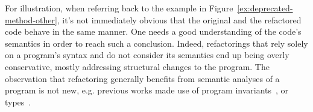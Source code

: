 \documentclass[sigconf,review,anonymous]{acmart}
\begin{document}
For
illustration, when referring back to the example in
Figure~\ref{ex:deprecated-method-other}, it's not immediately
obvious that the original and the refactored code behave in the same manner.
One needs a good understanding of the
code's semantics in order to reach such a conclusion.
%
%
%
%
%
Indeed, refactorings that rely solely on a program's syntax
and do not consider its semantics end up
being overly conservative, mostly addressing structural changes
to the program.  
The observation that 
refactoring generally benefits from semantic analyses of a program is not new, e.g. previous works made use of program invariants~\cite{Kataoka:2001:ASP:846228.848644}, or types~\cite{Steimann2011,Steimann2012Pilgrim,Steimann2011KollePilgrim}.
\end{document}
